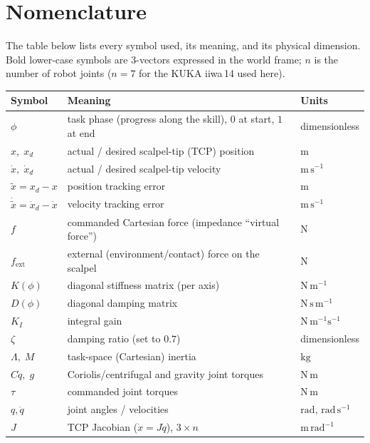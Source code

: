 \documentclass[11pt,a4paper]{article}
\newcommand{\xt}{\tilde{x}}
\newcommand{\xtd}{\dot{\tilde{x}}}
\begin{document}
\tableofcontents
\bigskip

\section*{Nomenclature}
The table below lists every symbol used, its meaning, and its physical
dimension. Bold lower-case symbols are $3$-vectors expressed in the world frame;
$n$ is the number of robot joints ($n=7$ for the KUKA iiwa\,14 used here).

\begin{longtable}{p{3.4cm} p{8.1cm} p{2.6cm}}
\toprule
Symbol & Meaning & Units \\
\midrule
\endhead
$\phi$ & task phase (progress along the skill), $0$ at start, $1$ at end & dimensionless \\
$x,\;x_d$ & actual / desired scalpel-tip (TCP) position & $\mathrm{m}$ \\
$\dot x,\;\dot x_d$ & actual / desired scalpel-tip velocity & $\mathrm{m\,s^{-1}}$ \\
$\xt=x_d-x$ & position tracking error & $\mathrm{m}$ \\
$\xtd=\dot x_d-\dot x$ & velocity tracking error & $\mathrm{m\,s^{-1}}$ \\
$f$ & commanded Cartesian force (impedance ``virtual force'') & $\mathrm{N}$ \\
$f_{\text{ext}}$ & external (environment/contact) force on the scalpel & $\mathrm{N}$ \\
$K(\phi)$ & diagonal stiffness matrix (per axis) & $\mathrm{N\,m^{-1}}$ \\
$D(\phi)$ & diagonal damping matrix & $\mathrm{N\,s\,m^{-1}}$ \\
$K_I$ & integral gain & $\mathrm{N\,m^{-1}s^{-1}}$ \\
$\zeta$ & damping ratio (set to $0.7$) & dimensionless \\
$\Lambda,\;M$ & task-space (Cartesian) inertia & $\mathrm{kg}$ \\
$C\dot q,\;g$ & Coriolis/centrifugal and gravity joint torques & $\mathrm{N\,m}$ \\
$\tau$ & commanded joint torques & $\mathrm{N\,m}$ \\
$q,\dot q$ & joint angles / velocities & $\mathrm{rad},\,\mathrm{rad\,s^{-1}}$ \\
$J$ & TCP Jacobian ($\dot x = J\dot q$), $3\times n$ & $\mathrm{m\,rad^{-1}}$ \\

\end{longtable}
\end{document}
